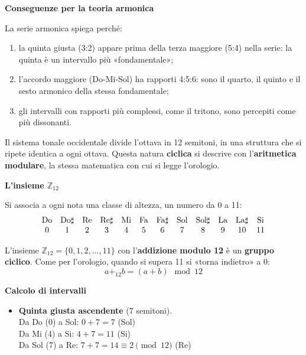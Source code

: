 \begin{fisica}
	\textbf{Conseguenze per la teoria armonica}

	La serie armonica spiega perché:
	\begin{enumerate}
		\item la quinta giusta (3:2) appare prima della terza maggiore (5:4) nella serie: la quinta è un intervallo più «fondamentale»;
		\item l'accordo maggiore (Do-Mi-Sol) ha rapporti 4:5:6: sono il quarto, il quinto e il sesto armonico della stessa fondamentale;
		\item gli intervalli con rapporti più complessi, come il tritono, sono percepiti come più dissonanti.
	\end{enumerate}
\end{fisica}

\begin{matematica}
	\label{math:aritmetica_modulare}

	Il sistema tonale occidentale divide l'ottava in 12 semitoni, in una struttura che si ripete identica a ogni ottava. Questa natura \textbf{ciclica} si descrive con l'\textbf{aritmetica modulare}, la stessa matematica con cui si legge l'orologio.

	\textbf{L'insieme $\mathbb{Z}_{12}$}

	Si associa a ogni nota una classe di altezza, un numero da 0 a 11:
	\[
	\begin{array}{cccccccccccc}
	\text{Do} & \text{Do\ensuremath{\sharp}{}} & \text{Re} & \text{Re\ensuremath{\sharp}{}} & \text{Mi} & \text{Fa} & \text{Fa\ensuremath{\sharp}{}} & \text{Sol} & \text{Sol\ensuremath{\sharp}{}} & \text{La} & \text{La\ensuremath{\sharp}{}} & \text{Si} \\
	0 & 1 & 2 & 3 & 4 & 5 & 6 & 7 & 8 & 9 & 10 & 11
	\end{array}
	\]

	L'insieme $\mathbb{Z}_{12} = \{0, 1, 2, \ldots, 11\}$ con l'\textbf{addizione modulo 12} è un \textbf{gruppo ciclico}. Come per l'orologio, quando si supera 11 si «torna indietro» a 0:
	\[
	a +_{12} b = (a + b) \mod 12
	\]

	\textbf{Calcolo di intervalli}

	\begin{itemize}
		\item \textbf{Quinta giusta ascendente} (7 semitoni).\\
		Da Do (0) a Sol: $0 + 7 = 7$ (Sol)\\
		Da Mi (4) a Si: $4 + 7 = 11$ (Si)\\
		Da Sol (7) a Re: $7 + 7 = 14 \equiv 2 \pmod{12}$ (Re)


\end{itemize}
\end{matematica}
